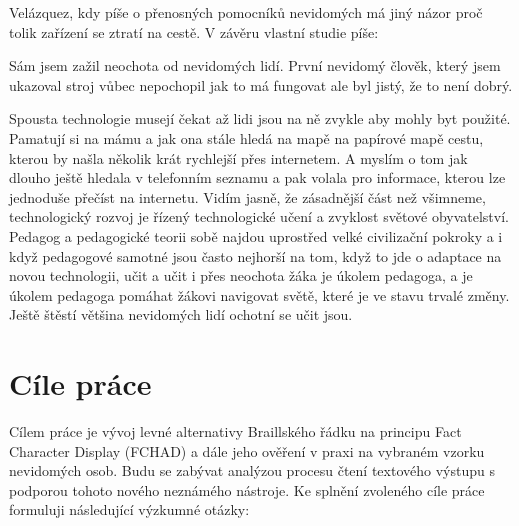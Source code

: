 Velázquez, kdy píše o přenosných pomocníků nevidomých má jiný názor proč tolik zařízení se ztratí na cestě.  V závěru vlastní studie píše:
\em
{}\em \citep[str. 15, přeložený z angičtiny]{velazquez2010wearable}%

Sám jsem zažil neochota od nevidomých lidí. První nevidomý člověk, který jsem ukazoval stroj vůbec nepochopil jak to má fungovat ale byl jistý, že to není dobrý.

Spousta technologie musejí čekat až lidi jsou na ně zvykle aby mohly byt použité.  Pamatují si na mámu a jak ona stále hledá na mapě na papírové mapě cestu, kterou by našla několik krát rychlejší přes internetem.  A myslím o tom jak dlouho ještě hledala v telefonním seznamu a pak volala pro informace, kterou lze jednoduše přečíst na internetu.  Vidím jasně, že zásadnější část než všimneme, technologický rozvoj je řízený technologické učení a zvyklost světové obyvatelství.  Pedagog a pedagogické teorii sobě najdou uprostřed velké civilizační pokroky a i když pedagogové samotné jsou často nejhorší na tom, když to jde o adaptace na novou technologii, učit a učit i přes neochota žáka je úkolem pedagoga, a je úkolem pedagoga pomáhat žákovi navigovat světě, které je ve stavu trvalé změny.  Ještě štěstí většina nevidomých lidí ochotní se učit jsou.

\section{Cíle práce}

Cílem práce je vývoj levné alternativy Braillského řádku na principu Fact Character Display (FCHAD) a dále jeho ověření v praxi na vybraném vzorku nevidomých osob. Budu se zabývat analýzou procesu čtení textového výstupu s podporou tohoto nového neznámého nástroje. Ke splnění zvoleného cíle práce formuluji následující výzkumné otázky:

